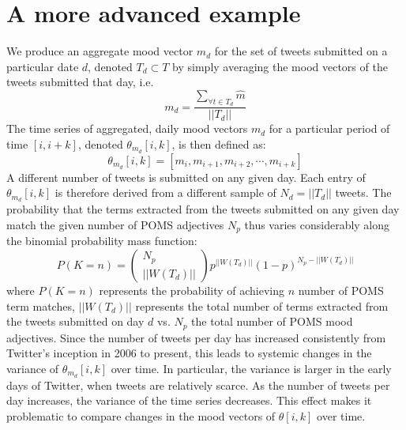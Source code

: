 \section{A more advanced example}
We produce an aggregate mood vector $m_d$ for the set of tweets submitted on a particular date $d$, denoted $T_d \subset T$ by simply averaging the mood vectors of the tweets submitted that day, i.e.
\[m_d = \frac{\sum_{\forall t \in T_d} \hat{m}}{||T_d||}\]
The time series of aggregated, daily mood vectors $m_d$ for a particular period of time $[i,i+k]$, denoted $\theta_{m_d}[i,k]$, is then defined as:
\[ \theta_{m_d}[i,k] = [ m_{i}, m_{i+1}, m_{i+2}, \cdots, m_{i+k}] \]
A different number of tweets is submitted on any given day. Each entry of $ \theta_{m_d}[i,k]$ is therefore derived from a different sample of $N_d = ||T_d||$ tweets. The probability that the terms extracted from the tweets submitted on any given day match the given number of POMS adjectives $N_p$ thus varies considerably along the binomial probability mass function:
\[P(K=n) = \left(\begin{array}{c}N_p\\||W(T_d)||\end{array}\right)p^{||W(T_d)||}(1-p)^{N_p-||W(T_d)||}\]
where $P(K=n)$ represents the probability of achieving $n$ number of POMS term matches, $||W(T_d)||$ represents the total number of terms extracted from the tweets submitted on day $d$ vs. $N_p$ the total number of POMS mood adjectives. Since the number of tweets per day has increased consistently from Twitter's inception in 2006 to present, this leads to systemic changes in the variance of $\theta_{m_d}[i,k]$ over time.  In particular, the variance is larger in the early days of Twitter, when tweets are relatively scarce. As the number of tweets per day increases, the variance of the time series decreases. This effect makes it problematic to compare changes in the mood vectors of $\theta[i,k]$ over time.